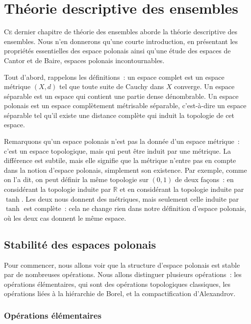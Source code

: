 \chapter{Théorie descriptive des ensembles}
\label{chp.desc}

\minitoc

\lettrine{C}{e} dernier chapitre de théorie des ensembles aborde la théorie
descriptive des ensembles. Nous n'en donnerons qu'une courte introduction, en
présentant les propriétés essentielles des espace polonais ainsi qu'une étude
des espaces de Cantor et de Baire, espaces polonais incontournables.

Tout d'abord, rappelons les définitions~: un espace complet est un espace
métrique $(X,d)$ tel que toute suite de Cauchy dans $X$ converge. Un espace
séparable est un espace qui contient une partie dense dénombrable. Un espace
polonais est un espace complètement métrisable séparable, c'est-à-dire un espace
séparable tel qu'il existe une distance complète qui induit la topologie de cet
espace.

Remarquons qu'un espace polonais n'est pas la donnée d'un espace métrique~:
c'est un espace topologique, mais qui peut être induit par une métrique. La
différence est subtile, mais elle signifie que la métrique n'entre pas en compte
dans la notion d'espace polonais, simplement son existence. Par exemple, comme
on l'a dit, on peut définir la même topologie sur $(0,1)$ de deux façons~: en
considérant la topologie induite par $\mathbb R$ et en considérant la topologie
induite par $\tanh$. Les deux nous donnent des métriques, mais seulement celle
induite par $\tanh$ est complète~: cela ne change rien dans notre définition
d'espace polonais, où les deux cas donnent le même espace.

\section{Stabilité des espaces polonais}

Pour commencer, nous allons voir que la structure d'espace polonais est stable
par de nombreuses opérations. Nous allons distinguer plusieurs opérations~: les
opérations élémentaires, qui sont des opérations topologiques classiques, les
opérations liées à la hiérarchie de Borel, et la compactification d'Alexandrov.

\subsection{Opérations élémentaires}


